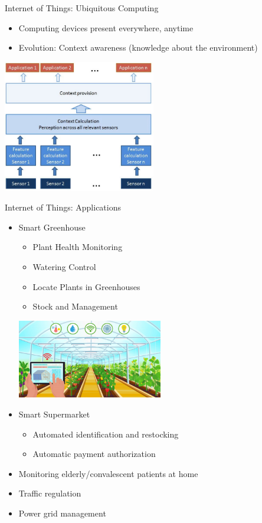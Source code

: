 \begin{frame}{Internet of Things: Ubiquitous Computing}
    \begin{itemize}
        \item Computing devices present everywhere, anytime
        \item Evolution: Context awareness (knowledge about the environment)
    \end{itemize}
    \centering
    \includegraphics[width=0.5\textwidth]{trainingmaterials/project2-iot/context-aware_computing_systems.jpg}
\end{frame}

\begin{frame}{Internet of Things: Applications}
    \begin{itemize}
        \item Smart Greenhouse
        \begin{itemize}
            \item Plant Health Monitoring
            \item Watering Control
            \item Locate Plants in Greenhouses
            \item Stock and Management
        \end{itemize}
        \begin{center}
             \includegraphics[width=0.5\textwidth]{trainingmaterials/project2-iot/greenhose.png}
        \end{center}
        \item Smart Supermarket
        \begin{itemize}
            \item Automated identification and restocking
            \item Automatic payment authorization
        \end{itemize}
        \item Monitoring elderly/convalescent patients at home
        \item Traffic regulation
        \item Power grid management
    \end{itemize}
\end{frame}

